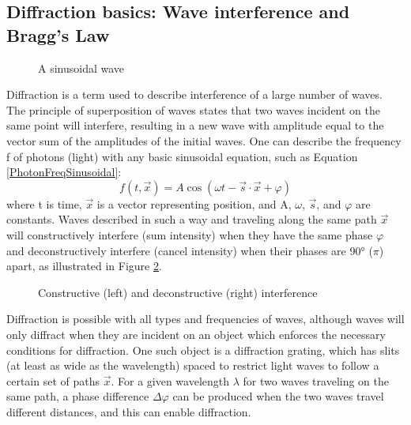 \subsection{Diffraction basics: Wave interference and Bragg's Law}
\begin{figure}[htbp]
  \centering
  
  \caption{A sinusoidal wave}
  \label{basicwave}
\end{figure}
Diffraction is a term used to describe interference of a large number of waves. The principle of superposition of waves states that two waves incident on the same point will interfere, resulting in a new wave with amplitude equal to the vector sum of the amplitudes of the initial waves. One can describe the frequency f of photons (light) with any basic sinusoidal equation, such as Equation \ref{PhotonFreqSinusoidal}:
\begin{equation}
     f(t,\vec{x})=A\cos{(\omega t-\vec{s}\cdot\vec{x}+\varphi)}
    \label{PhotonFreqSinusoidal}
\end{equation}
where t is time, $\vec{x}$ is a vector representing position, and A, $\omega$, $\vec{s}$, and $\varphi$ are constants. Waves described in such a way and traveling along the same path $\vec{x}$ will constructively interfere (sum intensity) when they have the same phase $\varphi$ and deconstructively interfere (cancel intensity) when their phases are \ang{90} ($\pi$) apart, as illustrated in Figure \ref{interference}.
\begin{figure}[htbp]
  \centering
  
  \caption{Constructive (left) and deconstructive (right) interference}
  \label{interference}
\end{figure}
Diffraction is possible with all types and frequencies of waves, although waves will only diffract when they are incident on an object which enforces the necessary conditions for diffraction. One such object is a diffraction grating, which has slits (at least as wide as the wavelength) spaced to restrict light waves to follow a certain set of paths $\vec{x}$. For a given wavelength $\lambda$ for two waves traveling on the same path, a phase difference $\Delta\varphi$ can be produced when the two waves travel different distances, and this can enable diffraction.

